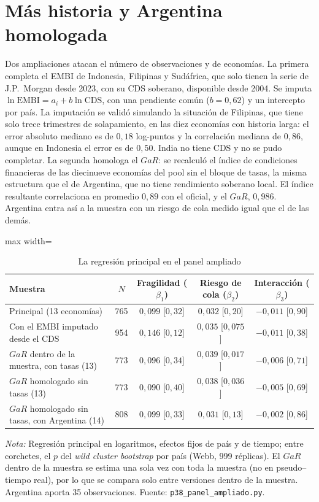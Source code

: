 \section{Más historia y Argentina homologada}
\label{sec:ampliado}

Dos ampliaciones atacan el número de observaciones y de economías. La primera completa el EMBI de Indonesia, Filipinas y Sudáfrica, que solo tienen la serie de J.P.\ Morgan desde 2023, con su CDS soberano, disponible desde 2004. Se imputa $\ln\mathrm{EMBI}=a_i+b\ln\mathrm{CDS}$, con una pendiente común ($b=0{,}62$) y un intercepto por país. La imputación se validó simulando la situación de Filipinas, que tiene solo trece trimestres de solapamiento, en las diez economías con historia larga: el error absoluto mediano es de $0{,}18$ log-puntos y la correlación mediana de $0{,}86$, aunque en Indonesia el error es de $0{,}50$. India no tiene CDS y no se pudo completar. La segunda homologa el $GaR$: se recalculó el índice de condiciones financieras de las diecinueve economías del pool sin el bloque de tasas, la misma estructura que el de Argentina, que no tiene rendimiento soberano local. El índice resultante correlaciona en promedio $0{,}89$ con el oficial, y el $GaR$, $0{,}986$. Argentina entra así a la muestra con un riesgo de cola medido igual que el de las demás.

\begin{table}[htbp]
\centering
\small
\caption[Panel ampliado]{La regresión principal en el panel ampliado}
\label{tab:ampliado}
\begin{adjustbox}{max width=\linewidth}
\begin{tabular}{l c ccc}
\toprule
Muestra & $N$ & Fragilidad ($\beta_1$) & Riesgo de cola ($\beta_2$) & Interacción ($\beta_3$) \\
\midrule
Principal (13 economías) & 765 & $0{,}099$ [$0{,}32$] & $0{,}032$ [$0{,}20$] & $-0{,}011$ [$0{,}90$] \\
Con el EMBI imputado desde el CDS & 954 & $0{,}146$ [$0{,}12$] & $0{,}035$ [$0{,}075$] & $-0{,}011$ [$0{,}38$] \\
\addlinespace
$GaR$ dentro de la muestra, con tasas (13) & 773 & $0{,}096$ [$0{,}34$] & $0{,}039$ [$0{,}017$] & $-0{,}006$ [$0{,}71$] \\
$GaR$ homologado sin tasas (13) & 773 & $0{,}090$ [$0{,}40$] & $0{,}038$ [$0{,}036$] & $-0{,}005$ [$0{,}69$] \\
$GaR$ homologado sin tasas, con Argentina (14) & 808 & $0{,}099$ [$0{,}33$] & $0{,}031$ [$0{,}13$] & $-0{,}002$ [$0{,}86$] \\
\bottomrule
\end{tabular}
\end{adjustbox}
\par\smallskip\parbox{0.95\linewidth}{\footnotesize \textit{Nota:} Regresión principal en logaritmos, efectos fijos de país y de tiempo; entre corchetes, el $p$ del \textit{wild cluster bootstrap} por país (Webb, 999 réplicas). El $GaR$ dentro de la muestra se estima una sola vez con toda la muestra (no en pseudo--tiempo real), por lo que se compara solo entre versiones dentro de la muestra. Argentina aporta 35 observaciones. Fuente: \texttt{p38\_panel\_ampliado.py}.}
\end{table}

